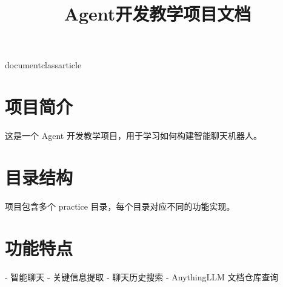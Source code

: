 documentclass{article}
\usepackage{fontspec}
\usepackage{geometry}
\geometry{a4paper, margin=2.54cm}

\setmainfont{Times New Roman}
\setsansfont{Arial}
\setmonofont{Courier New}

\usepackage{xeCJK}

\title{Agent开发教学项目文档}
\author{}
\date{}


\maketitle

\section{项目简介}

这是一个 Agent 开发教学项目，用于学习如何构建智能聊天机器人。

\section{目录结构}

项目包含多个 practice 目录，每个目录对应不同的功能实现。

\section{功能特点}

- 智能聊天
- 关键信息提取
- 聊天历史搜索
- AnythingLLM 文档仓库查询

